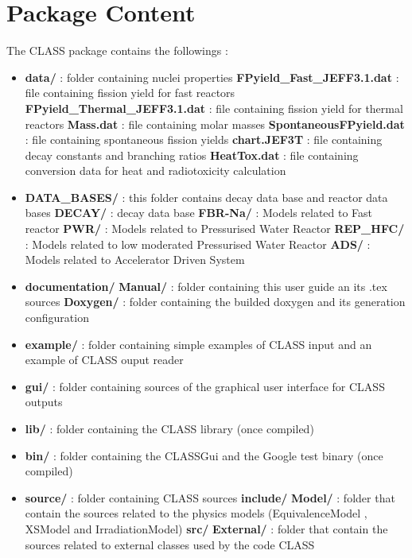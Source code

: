 \chapter{Package Content}
The CLASS package contains the followings :
\begin{itemize}
\item   \textbf{data/} : folder containing nuclei properties
\subitem \textbf{FPyield\_Fast\_JEFF3.1.dat }     : file containing fission yield for fast reactors
\subitem \textbf{FPyield\_Thermal\_JEFF3.1.dat}   : file containing fission yield for thermal reactors
\subitem \textbf{Mass.dat }                     : file containing molar masses
\subitem \textbf{SpontaneousFPyield.dat }       : file containing spontaneous fission yields
\subitem \textbf{chart.JEF3T}                   : file containing decay constants and branching ratios
\subitem \textbf{HeatTox.dat}                   : file containing conversion data for heat and radiotoxicity calculation

 \item \textbf{DATA\_BASES/}  : this folder contains decay data base and reactor data bases
 \subitem \textbf{DECAY/}     : decay data base
 \subitem \textbf{FBR-Na/}    : Models related to Fast reactor
 \subitem \textbf{PWR/}       : Models related to Pressurised Water Reactor
 \subitem \textbf{REP_HFC/}   : Models related to low moderated Pressurised Water Reactor 
 \subitem \textbf{ADS/}       : Models related to Accelerator Driven System
 
 \item \textbf{documentation/} 
 \subitem \textbf{Manual/}    : folder containing this user guide an its .tex sources
 \subitem \textbf{Doxygen/}   : folder containing the builded doxygen and its generation configuration 

\item \textbf{example/} : folder containing simple examples of CLASS input and an example of CLASS ouput reader

\item \textbf{gui/} : folder containing sources of the graphical user interface for CLASS outputs
 
\item \textbf{lib/} : folder containing the CLASS library (once compiled)
\item \textbf{bin/} : folder containing the CLASSGui and the Google test binary (once compiled)

\item \textbf{source/} : folder containing CLASS sources
\subitem \textbf{include/}
\subitem \textbf{Model/} : folder that contain the sources related to the physics models (EquivalenceModel , XSModel and IrradiationModel)
\subitem \textbf{src/}
\subitem \textbf{External/} : folder that contain the sources related to external classes used by the code CLASS


\end{itemize}
